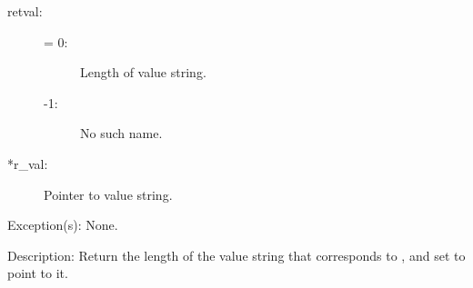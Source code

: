 \begin{capi}
\begin{capilist}
\begin{description}
		\item[retval: ]
			\begin{description}\item[]
			\item[{\gt}= 0: ]
				Length of value string.
			\item[-1: ]
				No such name.
			\end{description}
		\item[*r\_val: ]
			Pointer to value string.
		\end{description}
	\item[Exception(s): ] None.
	\item[Description: ]
		Return the length of the value string that corresponds to
		, and set  to point to it.
	\end{capilist}
\end{capi}

